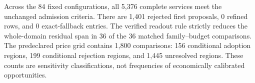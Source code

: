 Across the 84 fixed configurations, all 5,376 complete services meet the unchanged admission criteria. There are 1,401 rejected first proposals, 0 refined rows, and 0 exact-fallback entries. The verified readout rule strictly reduces the whole-domain residual span in 36 of the 36 matched family--budget comparisons. The predeclared price grid contains 1,800 comparisons: 156 conditional adoption regions, 199 conditional rejection regions, and 1,445 unresolved regions. These counts are sensitivity classifications, not frequencies of economically calibrated opportunities.
